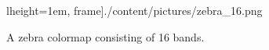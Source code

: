 \begin{description}
\begin{figure}[htb]
lheight=1em, frame]{./content/pictures/zebra_16.png}
			  \caption{A zebra colormap consisting of 16 bands. }
			\end{figure}
		\end{description}

